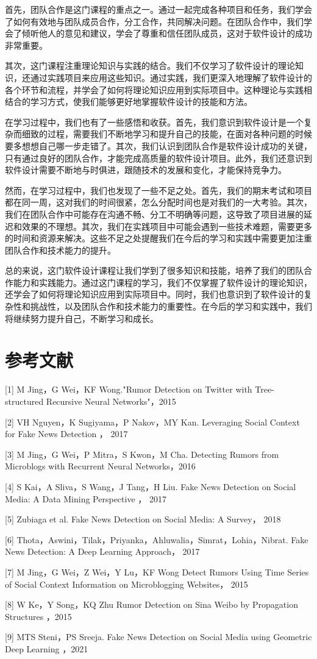 \documentclass{article}
\begin{document}
首先，团队合作是这门课程的重点之一。通过一起完成各种项目和任务，我们学会了如何有效地与团队成员合作，分工合作，共同解决问题。在团队合作中，我们学会了倾听他人的意见和建议，学会了尊重和信任团队成员，这对于软件设计的成功非常重要。

其次，这门课程注重理论知识与实践的结合。我们不仅学习了软件设计的理论知识，还通过实践项目来应用这些知识。通过实践，我们更深入地理解了软件设计的各个环节和流程，并学会了如何将理论知识应用到实际项目中。这种理论与实践相结合的学习方式，使我们能够更好地掌握软件设计的技能和方法。

在学习过程中，我们也有了一些感悟和收获。首先，我们意识到软件设计是一个复杂而细致的过程，需要我们不断地学习和提升自己的技能，在面对各种问题的时候要多想想自己哪一步走错了。其次，我们认识到团队合作是软件设计成功的关键，只有通过良好的团队合作，才能完成高质量的软件设计项目。此外，我们还意识到软件设计需要不断地与时俱进，跟随技术的发展和变化，才能保持竞争力。

然而，在学习过程中，我们也发现了一些不足之处。首先，我们的期末考试和项目都在同一周，这对我们的时间很紧，怎么分配时间也是对我们的一大考验。其次，我们在团队合作中可能存在沟通不畅、分工不明确等问题，这导致了项目进展的延迟和效果的不理想。其次，我们在实践项目中可能会遇到一些技术难题，需要更多的时间和资源来解决。这些不足之处提醒我们在今后的学习和实践中需要更加注重团队合作和技术能力的提升。

总的来说，这门软件设计课程让我们学到了很多知识和技能，培养了我们的团队合作能力和实践能力。通过这门课程的学习，我们不仅掌握了软件设计的理论知识，还学会了如何将理论知识应用到实际项目中。同时，我们也意识到了软件设计的复杂性和挑战性，以及团队合作和技术能力的重要性。在今后的学习和实践中，我们将继续努力提升自己，不断学习和成长。


\section{参考文献}
[1] M Jing，G Wei，KF Wong."Rumor Detection on Twitter with Tree-structured Recursive Neural Networks"，2015

[2] VH Nguyen，K Sugiyama，P Nakov，MY Kan. Leveraging Social Context for Fake News Detection ， 2017

[3] M Jing，G Wei，P Mitra，S Kwon，M Cha.  Detecting Rumors from Microblogs with Recurrent Neural Networks，2016

[4] S Kai，A Sliva，S Wang，J Tang，H Liu.  Fake News Detection on Social Media: A Data Mining Perspective ， 2017

[5] Zubiaga et al.  Fake News Detection on Social Media: A Survey， 2018

[6] Thota，Aswini，Tilak，Priyanka，Ahluwalia，Simrat，Lohia，Nibrat. Fake News Detection: A Deep Learning Approach，  2017

[7] M Jing，G Wei，Z Wei，Y Lu，KF Wong Detect Rumors Using Time Series of Social Context Information on Microblogging Websites， 2015

[8] W Ke，Y Song，KQ Zhu Rumor Detection on Sina Weibo by Propagation Structures  ，2015 

[9] MTS Steni，PS Sreeja. Fake News Detection on Social Media using Geometric Deep Learning ，2021
\end{document}
